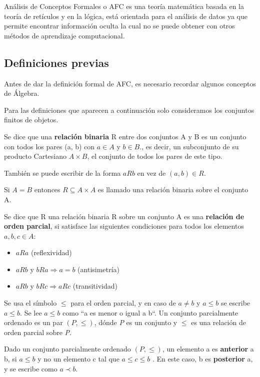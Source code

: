 \documentclass[../../main.tex]{subfiles}
\begin{document}
Análisis de Conceptos Formales o AFC\cite{fca} es una teoría matemática basada en la teoría de retículos y en la lógica, está orientada para el análisis de datos ya que permite encontrar información oculta la cual no se puede obtener con otros métodos de aprendizaje computacional. 


\subsection{Definiciones previas}

Antes de dar la definición formal de AFC, es necesario recordar algunos conceptos de Álgebra.

Para las definiciones que aparecen a continuación solo consideramos los conjuntos finitos de objetos.

\begin{definicion}
Se dice que una \textbf{relación binaria} R entre dos conjuntos A y B es un conjunto con todos los pares (a, b) con $a \in A$ y $b \in B$., es decir, un subconjunto de su producto Cartesiano $A \times B$, el conjunto de todos los pares de este tipo.
\end{definicion}

También se puede escribir de la forma $aRb$ en vez de $(a,b) \in R$. 

Si $A = B$ entonces $R \subseteq A \times A$ es llamado una relación binaria sobre el conjunto A.


\begin{definicion}
Se dice que R una relación binaria R sobre un conjunto A es una \textbf{relación de orden parcial}, si satisface las siguientes condiciones para todos los elementos $a,b,c \in A$:
\begin{itemize}
    \item $aRa$ (reflexividad)
    \item $aRb$ y $bRa \Longrightarrow a = b$ (antisimetría)
    \item $aRb$ y $bRc \Longrightarrow aRc$ (transitividad)
\end{itemize}
\end{definicion}

Se usa el símbolo $\leq$ para el orden parcial, y en caso de $a \neq b$ y $a \leq b$ se escribe $a \leq b$. Se lee $a \leq b$ como ``a es menor o igual a b``. 
Un conjunto parcialmente ordenado es un par $(P, \leq)$, dónde \textit{P} es un conjunto y $\leq$ es una relación de orden parcial sobre \textit{P}.


\begin{definicion}
Dado un conjunto parcialmente ordenado $(P,\leq)$, un elemento a es \textbf{anterior} a b, si $a \leq b$ y no un elemento c tal que $a \leq c \leq b$ . En este caso, b es \textbf{posterior} a, y se escribe como $a \prec b$.
\end{definicion}
\end{document}
